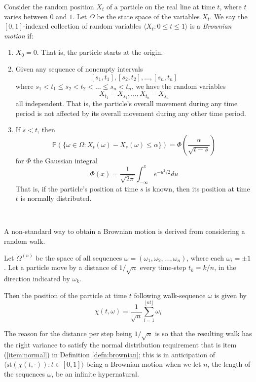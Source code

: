 \documentclass[11pt]{amsart}
\theoremstyle{remark}
\newcommand{\st}{\mathrm{st}}
\newcommand{\gaussian}{\Phi}
\begin{document}
\begin{defn} \label{defn:brownian}
Consider the random position $X_t$ of a particle on the real line at time $t$, where $t$ varies between $0$ and $1$.
Let $\Omega$ be the state space of the variables $X_t$.
We say the $[0,1]$-indexed collection of random variables $\langle X_t : 0 \leq t \leq 1 \rangle$ is a \emph{Brownian motion} if:
\begin{enumerate}
\item $X_0 = 0$. That is, the particle starts at the origin.
\item Given any sequence of nonempty intervals $$[s_1, t_1], [s_2, t_2], \dots, [s_n, t_n]$$
where $s_1 < t_1 \leq s_2 < t_2 < \dots \leq s_n < t_n$,
we have the random variables $$X_{t_1} - X_{s_1}, \dots, X_{t_n} - X_{s_n}$$ all independent.
That is, the particle's overall movement during any time period is not affected by its overall movement during any other time period.
\item \label{item:normal} If $s < t$, then $$\mathbb{P}( \{ \omega \in \Omega: X_t(\omega) - X_s(\omega) \leq \alpha \} ) = \gaussian \left(\frac{\alpha}{\sqrt{t-s}} \right)$$
for $\gaussian$ the Gaussian integral $$\gaussian(x) = \frac{1}{\sqrt{2 \pi}} \int_{-\infty}^x e^{-u^2/2} du$$
That is, if the particle's position at time $s$ is known, then its position at time $t$ is normally distributed.
\end{enumerate}
\end{defn}

\

A non-standard way to obtain a Brownian motion is derived from considering a random walk.

Let $\Omega^{(n)}$ be the space of all sequences $\omega = (\omega_1, \omega_2, \dots, \omega_n)$, where each $\omega_i = \pm 1$.
Let a particle move by a distance of $1/\sqrt{n}$ every time-step $t_k = k/n$, in the direction indicated by $\omega_k$.

Then the position of the particle at time $t$ following walk-sequence $\omega$ is given by 
\begin{equation} \label{eqn:brownian}
\chi(t, \omega) = \frac{1}{\sqrt{n}} \sum_{i=1}^{\lfloor n t \rfloor} \omega_i
\end{equation}

The reason for the distance per step being $1/\sqrt{n}$ is so that the resulting walk has the right variance to satisfy the normal distribution requirement that is item (\ref{item:normal}) in Definition \ref{defn:brownian}; this is in anticipation of $\langle \st(\chi(t, \cdot)): t \in [0,1] \rangle$ being a Brownian motion when we let $n$, the length of the sequences $\omega$, be an infinite hypernatural.
\end{document}
